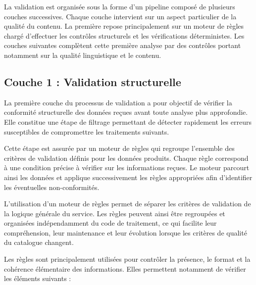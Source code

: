 La validation est organisée sous la forme d'un pipeline composé de plusieurs couches successives. Chaque couche intervient sur un aspect particulier de la qualité du contenu. La première repose principalement sur un moteur de règles chargé d'effectuer les contrôles structurels et les vérifications déterministes. Les couches suivantes complètent cette première analyse par des contrôles portant notamment sur la qualité linguistique et le contenu.

\subsection{Couche 1 : Validation structurelle}

La première couche du processus de validation a pour objectif de vérifier la conformité structurelle des données reçues avant toute analyse plus approfondie. Elle constitue une étape de filtrage permettant de détecter rapidement les erreurs susceptibles de compromettre les traitements suivants.

Cette étape est assurée par un moteur de règles qui regroupe l'ensemble des critères de validation définis pour les données produits. Chaque règle correspond à une condition précise à vérifier sur les informations reçues. Le moteur parcourt ainsi les données et applique successivement les règles appropriées afin d'identifier les éventuelles non-conformités.

L'utilisation d'un moteur de règles permet de séparer les critères de validation de la logique générale du service. Les règles peuvent ainsi être regroupées et organisées indépendamment du code de traitement, ce qui facilite leur compréhension, leur maintenance et leur évolution lorsque les critères de qualité du catalogue changent.

Les règles sont principalement utilisées pour contrôler la présence, le format et la cohérence élémentaire des informations. Elles permettent notamment de vérifier les éléments suivants :

